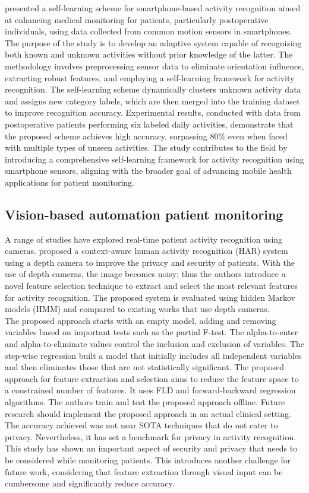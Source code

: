 \cite{smartphone} presented a self-learning scheme for smartphone-based activity recognition aimed at enhancing medical monitoring for patients, particularly postoperative individuals, using data collected from common motion sensors in smartphones. The purpose of the study is to develop an adaptive system capable of recognizing both known and unknown activities without prior knowledge of the latter. The methodology involves preprocessing sensor data to eliminate orientation influence, extracting robust features, and employing a self-learning framework for activity recognition. The self-learning scheme dynamically clusters unknown activity data and assigns new category labels, which are then merged into the training dataset to improve recognition accuracy. Experimental results, conducted with data from postoperative patients performing six labeled daily activities, demonstrate that the proposed scheme achieves high accuracy, surpassing 80\% even when faced with multiple types of unseen activities. The study contributes to the field by introducing a comprehensive self-learning framework for activity recognition using smartphone sensors, aligning with the broader goal of advancing mobile health applications for patient monitoring.

\subsection{Vision-based automation patient monitoring}
A range of studies have explored real-time patient activity recognition using cameras. \cite{Study6} proposed a context-aware human activity recognition (HAR) system using a depth camera to improve the privacy and security of patients. With the use of depth cameras, the image becomes noisy; thus the authors introduce a novel feature selection technique to extract and select the most relevant features for activity recognition. The proposed system is evaluated using hidden Markov models (HMM) and compared to existing works that use depth cameras.\\
The proposed approach starts with an empty model, adding and removing variables based on important tests such as the partial F-test. The alpha-to-enter and alpha-to-eliminate values control the inclusion and exclusion of variables. The step-wise regression built a model that initially includes all independent variables and then eliminates those that are not statistically significant. The proposed approach for feature extraction and selection aims to reduce the feature space to a constrained number of features. It uses FLD and forward-backward regression algorithms.
The authors train and test the proposed approach offline. Future research should implement the proposed approach in an actual clinical setting. The accuracy achieved was not near SOTA techniques that do not cater to privacy. Nevertheless, it has set a benchmark for privacy in activity recognition. This study has shown an important aspect of security and privacy that needs to be considered while monitoring patients. This introduces another challenge for future work, considering that feature extraction through visual input can be cumbersome and significantly reduce accuracy.

